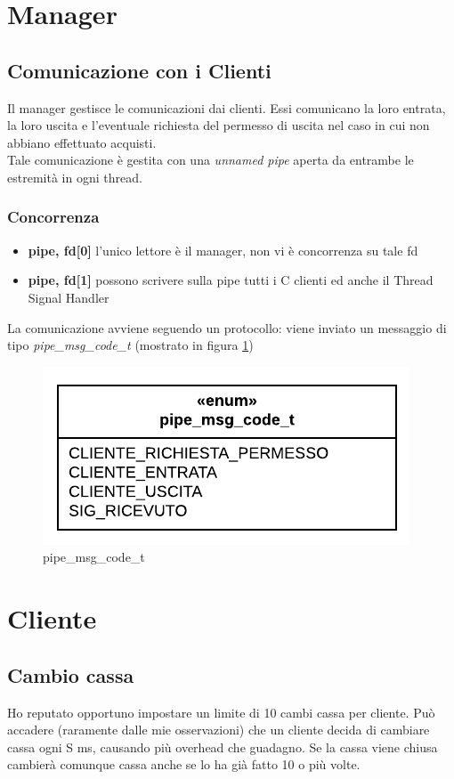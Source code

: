 \documentclass[11pt, a4paper]{article}
\begin{document}
\section{Manager}
\subsection{Comunicazione con i Clienti}
Il manager gestisce le comunicazioni dai clienti. Essi comunicano la loro entrata, la loro uscita e l'eventuale richiesta del permesso di uscita nel caso in cui non abbiano effettuato acquisti.\\
Tale comunicazione è gestita con una \textit{unnamed pipe} aperta da entrambe le estremità in ogni thread. 
\subsubsection{Concorrenza}
\begin{itemize}
\item \textbf{pipe, fd[0]} l'unico lettore è il manager, non vi è concorrenza su tale fd
\item \textbf{pipe, fd[1]} possono scrivere sulla pipe tutti i C clienti ed anche il Thread Signal Handler
\end{itemize}
La comunicazione avviene seguendo un protocollo: viene inviato un messaggio di tipo \textit{pipe\_msg\_code\_t} (mostrato in figura \ref{fig:pipemsg})
\begin{figure}[h]
	\centering
	\includegraphics[scale=0.8]{pipemsg.png}
	\caption{pipe\_msg\_code\_t}
	\label{fig:pipemsg}
\end{figure}


\section{Cliente}
\subsection{Cambio cassa}
Ho reputato opportuno impostare un limite di 10 cambi cassa per cliente. Può accadere (raramente dalle mie osservazioni) che un cliente decida di cambiare cassa ogni S ms, causando più overhead che guadagno. Se la cassa viene chiusa cambierà comunque cassa anche se lo ha già fatto 10 o più volte.
\end{document}
